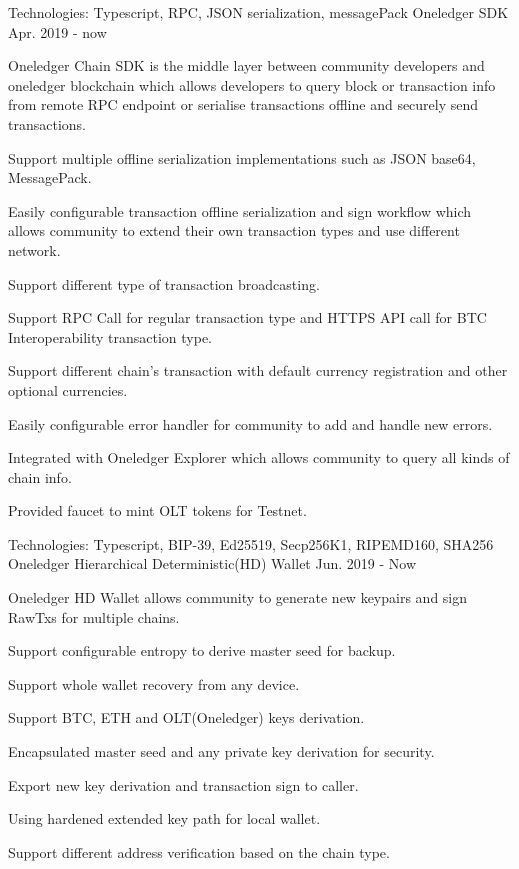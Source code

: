 \begin{cventries}
\cventry
    {Technologies: \quad Typescript, RPC, JSON serialization, messagePack
    }
    {Oneledger SDK}
    {}
    {Apr. 2019 - now}
    {
      \begin{cvitems}
        \item {Oneledger Chain SDK is the middle layer between community developers and oneledger blockchain which allows developers to query block or transaction info from remote RPC endpoint or serialise transactions offline and securely send transactions.}
        \item {Support multiple offline serialization implementations such as JSON base64,  MessagePack.}
        \item {Easily configurable transaction offline serialization and sign workflow which allows community to extend their own transaction types and use different network.}
        \item {Support different type of transaction broadcasting.}
        \item {Support RPC Call for regular transaction type and HTTPS API call for BTC Interoperability transaction type.}
        \item {Support different chain's transaction with default currency registration and other optional currencies.}
        \item {Easily configurable error handler for community to add and handle new errors.}
        \item {Integrated with Oneledger Explorer which allows community to query all kinds of chain info.}
        \item {Provided faucet to mint OLT tokens for Testnet.}
      \end{cvitems}
    }

\cventry
    {Technologies: \quad Typescript, BIP-39, Ed25519, Secp256K1, RIPEMD160, SHA256
    }
    {Oneledger Hierarchical Deterministic(HD) Wallet}
    {}
    {Jun. 2019 - Now}
    {
      \begin{cvitems}
        \item {Oneledger HD Wallet allows community to generate new keypairs and sign RawTxs for multiple chains.}
        \item {Support configurable entropy to derive master seed for backup.}
        \item {Support whole wallet recovery from any device.}
        \item {Support BTC, ETH and OLT(Oneledger) keys derivation.}
        \item {Encapsulated master seed and any private key derivation for security.}
        \item {Export new key derivation and transaction sign to caller.}
        \item {Using hardened extended key path for local wallet.}
        \item {Support different address verification based on the chain type.}
      \end{cvitems}
    }
    

\end{cventries}
